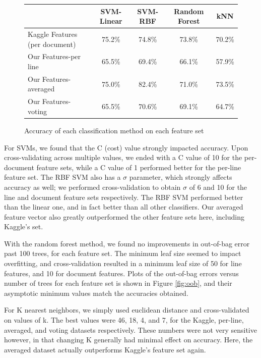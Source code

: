 \documentclass[paper=a4, fontsize=11pt]{scrartcl} %
\numberwithin{equation}{section} %
\numberwithin{figure}{section} %
\numberwithin{table}{section} %
\begin{document}
\begin{figure}
  \begin{center}
    \begin{tabular} { | l | c | c | c | c | }
      \hline
      & SVM-Linear & SVM-RBF & Random Forest & kNN \\ \hline
      Kaggle Features (per document) & 75.2\% & 74.8\% & 73.8\% & 70.2\% \\ \hline
      Our Features-per line & 65.5\% & 69.4\% & 66.1\% & 57.9\% \\ \hline
      Our Features-averaged & 75.0\% & 82.4\% & 71.0\% & 73.5\% \\ \hline
      Our Features-voting & 65.5\% & 70.6\% & 69.1\% & 64.7\% \\ \hline
    \end{tabular}
  \end{center}
  \caption{Accuracy of each classification method on each feature set}
  \label{fig:resultsTable}
\end{figure}

For SVMs, we found that the C (cost) value strongly impacted
accuracy. Upon cross-validating across multiple values, we ended with
a C value of 10 for the per-document feature sets, while a C value of
1 performed better for the per-line feature set. The RBF SVM also has
a $\sigma$ parameter, which strongly affects accuracy as well; we
performed cross-validation to obtain $\sigma$ of 6 and 10 for the line
and document feature sets respectively. The RBF SVM performed better
than the linear one, and in fact better than all other
classifiers. Our averaged feature vector also greatly outperformed the
other feature sets here, including Kaggle's set.

With the random forest method, we found no improvements in out-of-bag
error past 100 trees, for each feature set. The minimum leaf size
seemed to impact overfitting, and cross-validation resulted in a
minimum leaf size of 50 for line features, and 10 for document
features. Plots of the out-of-bag errors versus number of trees for
each feature set is shown in Figure \ref{fig:oob}, and their
asymptotic minimum values match the accuracies obtained.

For K nearest neighbors, we simply used euclidean distance and
cross-validated on values of k. The best values were 46, 18, 4, and 7,
for the Kaggle, per-line, averaged, and voting datasets
respectively. These numbers were not very sensitive however, in that
changing K generally had minimal effect on accuracy. Here, the
averaged dataset actually outperforms Kaggle's feature set again.
\end{document}
